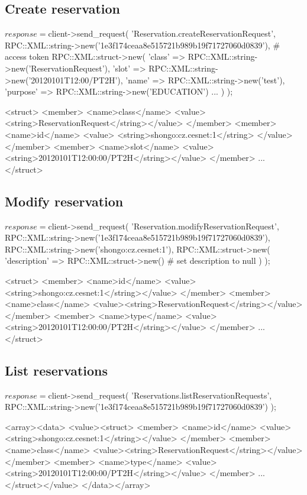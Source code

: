 \newpage
\subsection{Create reservation}
\begin{PerlCmd}
$response = $client->send_request(
    'Reservation.createReservationRequest',
    RPC::XML::string->new('1e3f174ceaa8e515721b989b19f71727060d0839'), # access token
    RPC::XML::struct->new(
        'class' => RPC::XML::string->new('ReservationRequest'),
        'slot' => RPC::XML::string->new('20120101T12:00/PT2H'),
        'name' => RPC::XML::string->new('test'),
        'purpose' => RPC::XML::string->new('EDUCATION')
        ...
    )
);
\end{PerlCmd}
\begin{PerlResponse}
<struct>
  <member>
    <name>class</name>
    <value><string>ReservationRequest</string></value>
  </member>
  <member>
    <name>id</name>
    <value>
      <string>shongo:cz.cesnet:1</string>
    </value>
  </member>
  <member>
    <name>slot</name>
    <value><string>20120101T12:00:00/PT2H</string></value>
  </member>
  ...
</struct>
\end{PerlResponse}

\newpage
\subsection{Modify reservation}
\begin{PerlCmd}
$response = $client->send_request(
    'Reservation.modifyReservationRequest',
    RPC::XML::string->new('1e3f174ceaa8e515721b989b19f71727060d0839'),
    RPC::XML::string->new('shongo:cz.cesnet:1'),
    RPC::XML::struct->new(
        'description' => RPC::XML::struct->new() # set description to null
    )
);
\end{PerlCmd}
\begin{PerlResponse}
<struct>
  <member>
    <name>id</name>
    <value><string>shongo:cz.cesnet:1</string></value>
  </member>
  <member>
    <name>class</name>
    <value><string>ReservationRequest</string></value>
  </member>
  <member>
    <name>type</name>
    <value><string>20120101T12:00:00/PT2H</string></value>
  </member>
  ...
</struct>
\end{PerlResponse}

\newpage
\subsection{List reservations}
\begin{PerlCmd}
$response = $client->send_request(
    'Reservations.listReservationRequests',
    RPC::XML::string->new('1e3f174ceaa8e515721b989b19f71727060d0839')
);
\end{PerlCmd}
\begin{PerlResponse}
<array><data>
  <value><struct>
    <member>
      <name>id</name>
      <value><string>shongo:cz.cesnet:1</string></value>
    </member>
    <member>
      <name>class</name>
      <value><string>ReservationRequest</string></value>
    </member>
    <member>
      <name>type</name>
      <value><string>20120101T12:00:00/PT2H</string></value>
    </member>
    ...
  </struct></value>
</data></array>
\end{PerlResponse}

